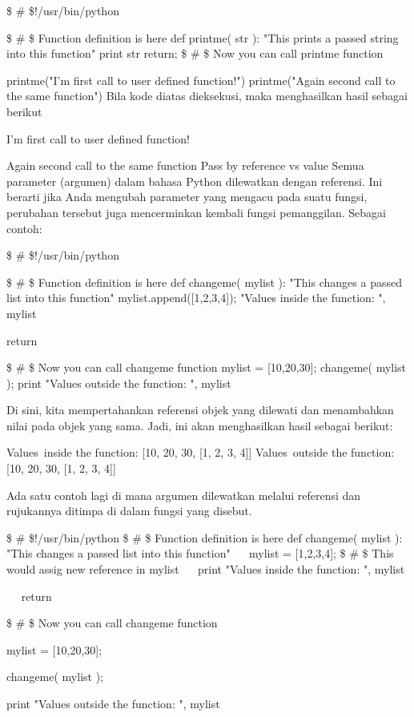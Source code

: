 \$  \#  \$!/usr/bin/python 

\$  \#  \$ Function definition is here
def printme( str ): 
"This prints a passed string into this function" 
print str
return; 
\$  \#  \$ Now you can call printme function

printme("I'm first call to user defined function!")
printme("Again second call to the same function") 
Bila kode diatas dieksekusi, maka menghasilkan hasil sebagai berikut 

I'm first call to user defined function! 

Again second call to the same function 
Pass by reference vs value
Semua parameter (argumen) dalam bahasa Python dilewatkan dengan referensi. Ini berarti jika Anda mengubah parameter yang mengacu pada suatu fungsi, perubahan tersebut juga mencerminkan kembali fungsi pemanggilan. Sebagai contoh:

\$  \#  \$!/usr/bin/python 

\$  \#  \$ Function definition is here 
def changeme( mylist ): 
"This changes a passed list into this function" 
mylist.append([1,2,3,4]); 
"Values inside the function: ", mylist

return


\$  \#  \$ Now you can call changeme function 
mylist = [10,20,30]; 
changeme( mylist );
print "Values outside the function: ", mylist

Di sini, kita mempertahankan referensi objek yang dilewati dan menambahkan nilai pada objek yang sama. Jadi, ini akan menghasilkan hasil sebagai berikut:

Values~inside the function:  [10, 20, 30, [1, 2, 3, 4]] 
Values~outside the function:  [10, 20, 30, [1, 2, 3, 4]] 

Ada satu contoh lagi di mana argumen dilewatkan melalui referensi dan rujukannya ditimpa di dalam fungsi yang disebut. 

\$  \# \$!/usr/bin/python 
\$  \#  \$ Function definition is here 
def changeme( mylist ): 
"This changes a passed list into this function" 
~~ mylist = [1,2,3,4];  \$  \#  \$ This would assig new reference in mylist 
~~ print "Values inside the function: ", mylist 

~~ return 

\$  \#  \$ Now you can call changeme function 

mylist = [10,20,30]; 

changeme( mylist ); 

print "Values outside the function: ", mylist 

